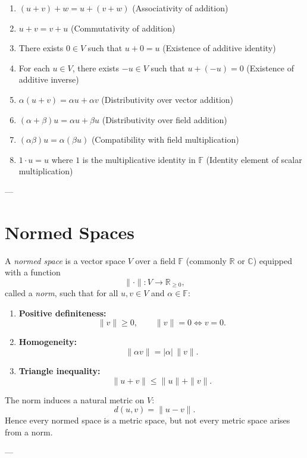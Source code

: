 \documentclass[11pt,a4paper]{article}
\theoremstyle{definition}
\theoremstyle{remark}
\begin{document}
	\begin{enumerate}
		\item $(u+v)+w = u+(v+w)$ \hfill (Associativity of addition)
		\item $u+v = v+u$ \hfill (Commutativity of addition)
		\item There exists $0 \in V$ such that $u+0=u$ \hfill (Existence of additive identity)
		\item For each $u \in V$, there exists $-u \in V$ such that $u+(-u)=0$ \hfill (Existence of additive inverse)
		\item $\alpha(u+v) = \alpha u + \alpha v$ \hfill (Distributivity over vector addition)
		\item $(\alpha+\beta)u = \alpha u + \beta u$ \hfill (Distributivity over field addition)
		\item $(\alpha \beta)u = \alpha(\beta u)$ \hfill (Compatibility with field multiplication)
		\item $1 \cdot u = u$ where $1$ is the multiplicative identity in $\mathbb{F}$ \hfill (Identity element of scalar multiplication)
	\end{enumerate}
	
	---
	\section*{Normed Spaces}
	
	A \emph{normed space} is a vector space $V$ over a field $\mathbb{F}$ (commonly $\mathbb{R}$ or $\mathbb{C}$) equipped with a function
	$$
	\|\cdot\| : V \to \mathbb{R}_{\geq 0},
	$$
	called a \emph{norm}, such that for all $u,v \in V$ and $\alpha \in \mathbb{F}$:
	
	\begin{enumerate}
		\item \textbf{Positive definiteness:}
		$$
		\|v\| \geq 0, \qquad \|v\|=0 \iff v=0.
		$$
		
		\item \textbf{Homogeneity:}
		$$
		\|\alpha v\| = |\alpha| \, \|v\|.
		$$
		
		\item \textbf{Triangle inequality:}
		$$
		\|u+v\| \leq \|u\| + \|v\|.
		$$
	\end{enumerate}
	
	The norm induces a natural metric on $V$:
	$$
	d(u,v) = \|u-v\|.
	$$
	Hence every normed space is a metric space, but not every metric space arises from a norm.
	
	---
	
\end{document}

